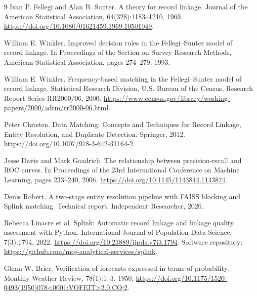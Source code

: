 \documentclass[11pt]{article}
\begin{document}
\begin{thebibliography}{9}
Ivan P. Fellegi and Alan B. Sunter.
\newblock A theory for record linkage.
\newblock Journal of the American Statistical Association, 64(328):1183--1210, 1969.
\newblock \url{https://doi.org/10.1080/01621459.1969.10501049}.

William E. Winkler.
\newblock Improved decision rules in the Fellegi--Sunter model of record linkage.
\newblock In Proceedings of the Section on Survey Research Methods, American Statistical Association, pages 274--279, 1993.

William E. Winkler.
\newblock Frequency-based matching in the Fellegi--Sunter model of record linkage.
\newblock Statistical Research Division, U.S. Bureau of the Census, Research Report Series RR2000/06, 2000.
\newblock \url{https://www.census.gov/library/working-papers/2000/adrm/rr2000-06.html}.

Peter Christen.
\newblock Data Matching: Concepts and Techniques for Record Linkage, Entity Resolution, and Duplicate Detection.
\newblock Springer, 2012.
\newblock \url{https://doi.org/10.1007/978-3-642-31164-2}.

Jesse Davis and Mark Goadrich.
\newblock The relationship between precision-recall and ROC curves.
\newblock In Proceedings of the 23rd International Conference on Machine Learning, pages 233--240, 2006.
\newblock \url{https://doi.org/10.1145/1143844.1143874}.

Denis Robert.
\newblock A two-stage entity resolution pipeline with FAISS blocking and Splink matching.
\newblock Technical report, Independent Researcher, 2026.

Rebecca Linacre et al.
\newblock Splink: Automatic record linkage and linkage quality assessment with Python.
\newblock International Journal of Population Data Science, 7(3):1794, 2022.
\newblock \url{https://doi.org/10.23889/ijpds.v7i3.1794}.
\newblock Software repository: \url{https://github.com/moj-analytical-services/splink}.

Glenn W. Brier.
\newblock Verification of forecasts expressed in terms of probability.
\newblock Monthly Weather Review, 78(1):1--3, 1950.
\newblock \url{https://doi.org/10.1175/1520-0493(1950)078<0001:VOFEIT>2.0.CO;2}.
\end{thebibliography}

\appendix
\end{document}
